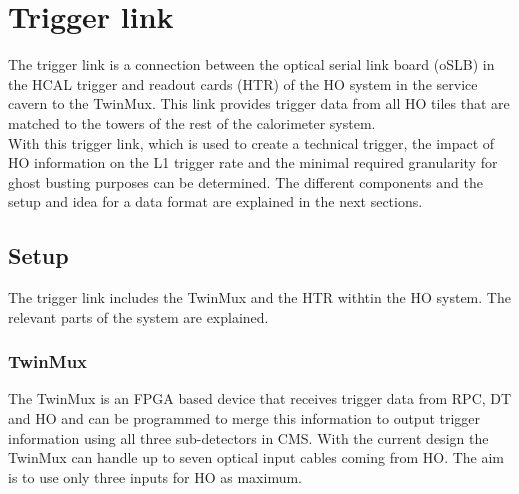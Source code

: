 \section{Trigger link}
The trigger link is a connection between the optical serial link board (oSLB) in the HCAL trigger and readout cards (HTR) of the HO system in the service cavern to the TwinMux. This link provides trigger data from all HO tiles that are matched to the towers of the rest of the calorimeter system.\\
With this trigger link, which is used to create a technical trigger, the impact of HO information on the L1 trigger rate and the minimal required granularity for ghost busting purposes can be determined.
The different components and the setup and idea for a data format are explained in the next sections.
\subsection{Setup}
The trigger link includes the TwinMux and the HTR withtin the HO system. The relevant parts of the system are explained.
\subsubsection{TwinMux}
The TwinMux is an FPGA based device that receives trigger data from RPC, DT and HO and can be programmed to merge this information to output trigger information using all three sub-detectors in CMS. With the current design the TwinMux can handle up to seven optical input cables coming from HO. The aim is to use only three inputs for HO as maximum.
